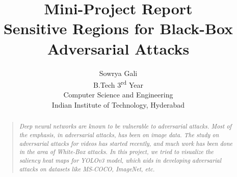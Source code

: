 \documentclass[letterpaper]{article}
\begin{document}
%
\title{ Mini-Project Report \\Sensitive Regions for Black-Box Adversarial Attacks }
\author{Sowrya Gali\\
B.Tech 3\textsuperscript{rd} Year\\
Computer Science and Engineering\\
Indian Institute of Technology, Hyderabad\\
}
\maketitle
\begin{abstract}
\begin{quote}
\emph{Deep neural networks are known to be vulnerable to adversarial attacks. Most of the emphasis, in adversarial attacks, has been on image data. The study on adversarial attacks for videos has started recently, and much work has been done in the area of White-Box attacks. In this project, we tried to visualize the saliency heat maps for YOLOv3 model, which aids in developing adversarial attacks on datasets like MS-COCO, ImageNet, etc.}
\end{quote}
\end{abstract}
\end{document}

